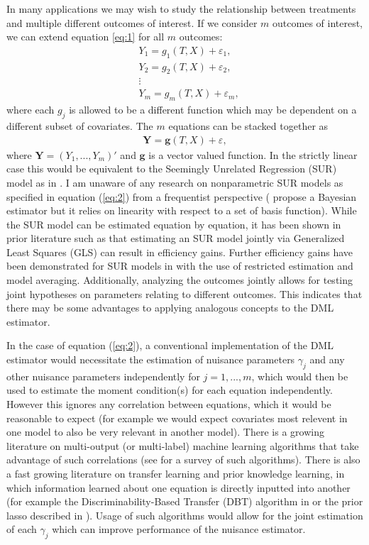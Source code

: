 \documentclass[12pt]{article}
\begin{document}
In many applications we may wish to study the relationship between treatments and multiple different outcomes of interest. If we consider $m$ outcomes of interest, we can extend equation \ref{eq:1} for all $m$ outcomes:
\begin{align*}
& Y_1 = g_1(T,X) +\varepsilon_1,\\
& Y_2 =  g_2(T,X) +\varepsilon_2,\\
&\vdots\\
&Y_m =  g_m(T,X) +\varepsilon_m,
\end{align*}
where each $g_j$ is allowed to be a different function which may be dependent on a different subset of covariates. The $m$ equations can be stacked together as
\begin{align}
\mathbf{Y} = \mathbf{g}(T,X) +\varepsilon\label{eq:2},
\end{align}  
where $\mathbf{Y} = (Y_1,...,Y_m)'$ and $\mathbf{g}$ is a vector valued function.  In the strictly linear case this would be equivalent to the Seemingly Unrelated Regression (SUR) model as in \cite{zellner}. I am unaware of any research on nonparametric SUR models as specified in equation (\ref{eq:2}) from a frequentist perspective (\cite{smith2000nonparametric} propose a Bayesian estimator but it relies on linearity with respect to a set of basis function). While the SUR model can be estimated equation by equation, it has been shown in prior literature such as \cite{zellner1963estimators} that estimating an SUR model jointly via Generalized Least Squares (GLS) can result in efficiency gains. Further efficiency gains have been demonstrated for SUR models in \cite{mehrabani2020improved} with the use of restricted estimation and model averaging. Additionally, analyzing the outcomes jointly allows for testing joint hypotheses on parameters relating to different outcomes. This indicates that there may be some advantages to applying analogous concepts to the DML estimator. 

In the case of equation (\ref{eq:2}), a conventional implementation of the DML estimator would necessitate the estimation of nuisance parameters $\gamma_j$ and any other nuisance parameters independently for $j=1,...,m$, which would then be used to estimate the moment condition(s) for each equation independently. However this ignores any correlation between equations, which it would be reasonable to expect (for example we would expect covariates most relevent in one model to also be very relevant in another model). There is a growing literature on multi-output (or multi-label) machine learning algorithms that take advantage of such correlations (see \cite{borchani2015survey} for a survey of such algorithms). There is also a fast growing literature on transfer learning and prior knowledge learning, in which information learned about one equation is directly inputted into another (for example the Discriminability-Based Transfer (DBT) algorithm in \cite{pratt1993discriminability} or the prior lasso described in \cite{jiang2016variable}). Usage of such algorithms would allow for the joint estimation of each $\gamma_j$ which can improve performance of the nuisance estimator. 
\end{document}
